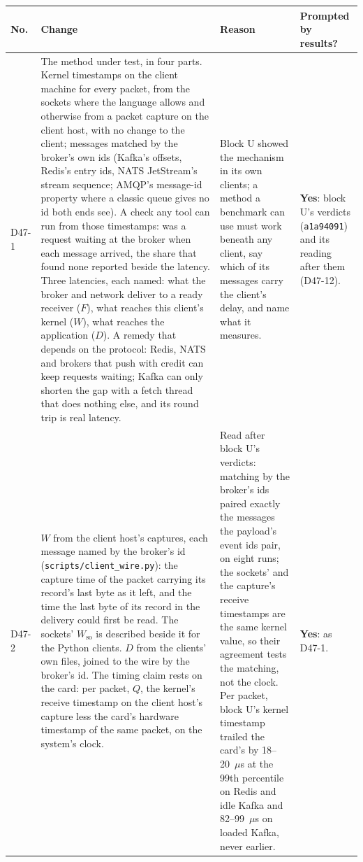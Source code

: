 \documentclass[11pt]{article}
\begin{document}
{\small
\begin{longtable}{@{}p{1.1cm} >{\raggedright\arraybackslash}p{6.1cm} >{\raggedright\arraybackslash}p{6.0cm} >{\raggedright\arraybackslash}p{2.2cm}@{}}
\toprule
\textbf{No.} & \textbf{Change} & \textbf{Reason} & \textbf{Prompted by results?} \\
\midrule
\endhead
D47-1 & The method under test, in four parts. Kernel timestamps on the client machine for every packet, from the sockets where the language allows and otherwise from a packet capture on the client host, with no change to the client; messages matched by the broker's own ids (Kafka's offsets, Redis's entry ids, NATS JetStream's stream sequence; AMQP's message-id property where a classic queue gives no id both ends see). A check any tool can run from those timestamps: was a request waiting at the broker when each message arrived, the share that found none reported beside the latency. Three latencies, each named: what the broker and network deliver to a ready receiver ($F$), what reaches this client's kernel ($W$), what reaches the application ($D$). A remedy that depends on the protocol: Redis, NATS and brokers that push with credit can keep requests waiting; Kafka can only shorten the gap with a fetch thread that does nothing else, and its round trip is real latency. & Block U showed the mechanism in its own clients; a method a benchmark can use must work beneath any client, say which of its messages carry the client's delay, and name what it measures. & \textbf{Yes}: block U's verdicts (\texttt{a1a94091}) and its reading after them (D47-12). \\
D47-2 & $W$ from the client host's captures, each message named by the broker's id (\texttt{scripts/client\_wire.py}): the capture time of the packet carrying its record's last byte as it left, and the time the last byte of its record in the delivery could first be read. The sockets' $W_{\mathrm{so}}$ is described beside it for the Python clients. $D$ from the clients' own files, joined to the wire by the broker's id. The timing claim rests on the card: per packet, $Q$, the kernel's receive timestamp on the client host's capture less the card's hardware timestamp of the same packet, on the system's clock. & Read after block U's verdicts: matching by the broker's ids paired exactly the messages the payload's event ids pair, on eight runs; the sockets' and the capture's receive timestamps are the same kernel value, so their agreement tests the matching, not the clock. Per packet, block U's kernel timestamp trailed the card's by 18--20~$\mu$s at the 99th percentile on Redis and idle Kafka and 82--99~$\mu$s on loaded Kafka, never earlier. & \textbf{Yes}: as D47-1. \\

\end{longtable}}
\end{document}
